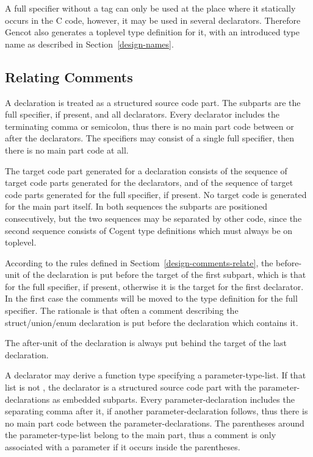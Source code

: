 A full specifier without a tag can only be used at the place where it statically occurs in the C code, however, it
may be used in several declarators. Therefore Gencot also generates a toplevel type definition for it, with an 
introduced type name as described in Section~\ref{design-names}.

\subsection{Relating Comments}

A declaration is treated as a structured source code part. The subparts are the full specifier, if present, and all
declarators. Every declarator includes the terminating comma or semicolon, thus there is no main part code between or after
the declarators. The specifiers may consist of a single full specifier, then there is no main part code at all.

The target code part generated for a declaration consists of the sequence of target code parts generated for the declarators,
and of the sequence of target code parts generated for the full specifier, if present. No target code is generated for the 
main part itself. In both sequences the subparts are 
positioned consecutively, but the two sequences may be separated by other code, since the second sequence consists of 
Cogent type definitions which must always be on toplevel. 

According to the rules defined in Sectiom~\ref{design-comments-relate}, the before-unit of the declaration is put before
the target of the first subpart, which is that for the full specifier, if present, otherwise it is the target for the
first declarator. In the first case the comments will be moved to the type definition for the full specifier. The rationale
is that often a comment describing the struct/union/enum declaration is put before the declaration which contains it.

The after-unit of the declaration is always put behind the target of the last declaration.

A declarator may derive a function type specifying a parameter-type-list. If that list is not , the 
declarator is a structured source code part with the parameter-declarations as embedded subparts. Every
parameter-declaration includes the separating comma after it, if another parameter-declaration follows,
thus there is no main part code between the parameter-declarations. The parentheses around the parameter-type-list
belong to the main part, thus a comment is only associated with a parameter if it occurs inside the parentheses.

